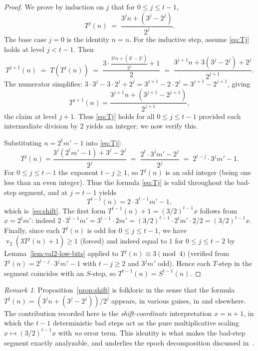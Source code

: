 \documentclass[11pt,a4paper]{article}
\theoremstyle{definition}
\theoremstyle{remark}
\newtheorem{remark}[theorem]{Remark}
\DeclareMathOperator{\val}{v}
\begin{document}
\begin{proof}
We prove by induction on $j$ that for $0 \leq j \leq t-1$,
\begin{equation}\label{eq:Tj}
  T^j(n) \;=\; \frac{3^j n + (3^j - 2^j)}{2^j}.
\end{equation}
The base case $j = 0$ is the identity $n = n$.  For the inductive step,
assume \eqref{eq:Tj} holds at level $j < t - 1$.  Then
\[
  T^{j+1}(n) \;=\; T(T^j(n))
  \;=\; \frac{3 \cdot \frac{3^j n + (3^j - 2^j)}{2^j} + 1}{2}
  \;=\; \frac{3^{j+1} n + 3(3^j - 2^j) + 2^j}{2^{j+1}}.
\]
The numerator simplifies:
$3 \cdot 3^j - 3 \cdot 2^j + 2^j = 3^{j+1} - 2 \cdot 2^j
= 3^{j+1} - 2^{j+1}$, giving
\[
  T^{j+1}(n) = \frac{3^{j+1} n + (3^{j+1} - 2^{j+1})}{2^{j+1}},
\]
the claim at level $j + 1$.  Thus \eqref{eq:Tj} holds for all
$0 \leq j \leq t - 1$ provided each intermediate division by $2$ yields
an integer; we now verify this.

Substituting $n = 2^t m' - 1$ into \eqref{eq:Tj}:
\[
  T^j(n) = \frac{3^j(2^t m' - 1) + 3^j - 2^j}{2^j}
  \;=\; \frac{2^t \cdot 3^j m' - 2^j}{2^j}
  \;=\; 2^{t - j} \cdot 3^j m' - 1.
\]
For $0 \leq j \leq t - 1$ the exponent $t - j \geq 1$, so $T^j(n)$ is an
odd integer (being one less than an even integer).  Thus the formula
\eqref{eq:Tj} is valid throughout the bad-step segment, and at $j = t-1$
yields
\[
  T^{t-1}(n) = 2 \cdot 3^{t-1} m' - 1,
\]
which is~\eqref{eq:shift}.  The first form $T^{t-1}(n) + 1 = (3/2)^{t-1}
x$ follows from $x = 2^t m'$: indeed
$2 \cdot 3^{t-1} m' = 3^{t-1} \cdot 2 m' = (3/2)^{t-1} \cdot 2^t m'
\cdot 2 / 2 = (3/2)^{t-1} x$.  Finally, since each $T^j(n)$ is odd for
$0 \leq j \leq t - 1$, we have $\val_2(3 T^j(n) + 1) \geq 1$ (forced)
and indeed equal to $1$ for $0 \leq j \leq t - 2$ by
Lemma~\ref{lem:val2-low-bits} applied to $T^j(n) \equiv 3 \pmod 4$
(verified from $T^j(n) = 2^{t-j} \cdot 3^j m' - 1$ with $t - j \geq 2$
and $3^j m'$ odd).  Hence each $T$-step in the segment coincides with an
$S$-step, so $T^{t-1}(n) = S^{t-1}(n)$.
\end{proof}

\begin{remark}
Proposition~\ref{prop:shift} is folkloric in the sense that the formula
$T^j(n) = (3^j n + (3^j - 2^j))/2^j$ appears, in various guises, in
\cite{Lagarias1985,Wirsching1998} and elsewhere.  The contribution
recorded here is the \emph{shift-coordinate} interpretation
$x = n + 1$, in which the $t-1$ deterministic bad steps act as the pure
multiplicative scaling $x \mapsto (3/2)^{t-1} x$ with \emph{no} error
term.  This identity is what makes the bad-step segment exactly
analyzable, and underlies the epoch decomposition discussed
in~\cite{Lagarias1985}.
\end{remark}
\end{document}
